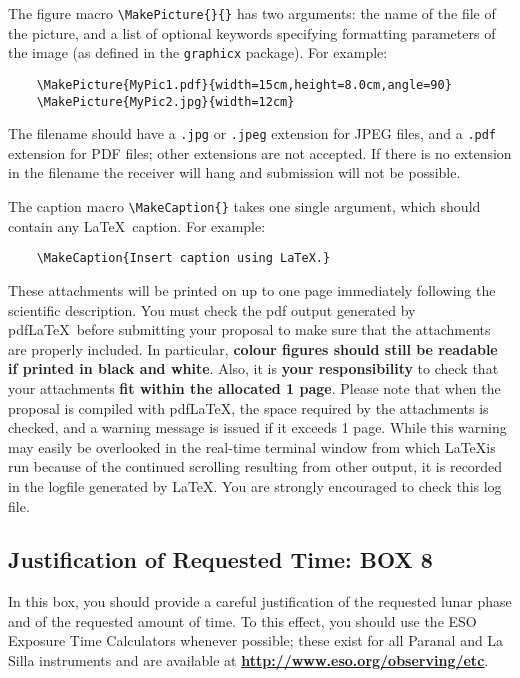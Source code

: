 \documentclass{article}
\begin{document}
The figure macro \verb|\MakePicture{}{}| has two arguments: the name
of the file of the picture, and a list of optional keywords specifying
formatting parameters of the image (as defined in the {\tt graphicx}
package). For example:
\begin{verbatim}
    \MakePicture{MyPic1.pdf}{width=15cm,height=8.0cm,angle=90}
    \MakePicture{MyPic2.jpg}{width=12cm}
\end{verbatim}
The filename should have a {\tt .jpg} or {\tt .jpeg} extension for
JPEG files, and a {\tt .pdf} extension for PDF files; other extensions
are not accepted. If there is no extension in the filename the receiver
will hang and submission will not be possible.

The caption macro \verb|\MakeCaption{}| takes one single  argument,
which should contain any \LaTeX\ caption. For example:
\begin{verbatim}
    \MakeCaption{Insert caption using LaTeX.}
\end{verbatim}

These attachments will be printed on up to one page
immediately following the scientific description. You must check the
pdf output generated by pdf\LaTeX\ before submitting your proposal to
make sure that the attachments are properly included. In particular,
{\bf colour figures should still be readable if printed in  
black and white}. Also,
it is {\bf your responsibility} to check that your attachments 
{\bf fit within the allocated 1 page}. Please note that
when the proposal is compiled with pdf\LaTeX, the space required by
the attachments is checked, and a warning message is issued if it 
exceeds 1 page. While this warning may easily be overlooked in the
real-time terminal window from which \LaTeX is run because of the
continued scrolling resulting from other output, it is recorded in the
logfile generated by LaTeX. You are strongly encouraged to check
this log file.

\subsection{Justification of Requested Time: {\bf BOX 8}}

In this box, you should provide a careful justification of the
requested lunar phase and of the requested amount of time. 
To this effect, you should use the ESO Exposure
Time Calculators whenever possible; these exist for all Paranal and La Silla
instruments and are available at
\href{http://www.eso.org/observing/etc}{\bf\underline{http://www.eso.org/observing/etc}}. 
\end{document}
